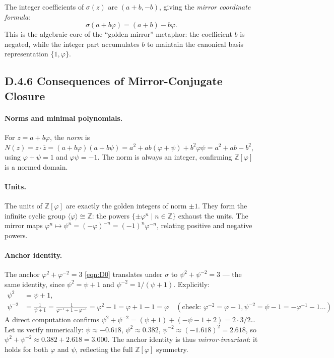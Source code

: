 \begin{remark}
The integer coefficients of $\sigma(z)$ are $(a+b, -b)$, giving the
\emph{mirror coordinate formula}:
\[
  \boxed{\sigma(a + b\varphi) = (a+b) - b\varphi.}
  \tag{D.1}
\]
This is the algebraic core of the ``golden mirror'' metaphor:
the coefficient $b$ is negated, while the integer part accumulates $b$
to maintain the canonical basis representation $\{1, \varphi\}$.
\end{remark}

\subsection*{D.4.6  Consequences of Mirror-Conjugate Closure}

\paragraph{Norms and minimal polynomials.}
For $z = a + b\varphi$, the \emph{norm} is
$N(z) = z\cdot\bar{z} = (a+b\varphi)(a+b\psi) = a^2 + ab(\varphi+\psi) + b^2\varphi\psi
= a^2 + ab - b^2$,
using $\varphi+\psi=1$ and $\varphi\psi=-1$.
The norm is always an integer, confirming $\mathbb{Z}[\varphi]$ is a
normed domain.

\paragraph{Units.}
The units of $\mathbb{Z}[\varphi]$ are exactly the golden integers of norm $\pm 1$.
They form the infinite cyclic group $\langle \varphi \rangle \cong \mathbb{Z}$:
the powers $\{\pm\varphi^n \mid n\in\mathbb{Z}\}$ exhaust the units.
The mirror maps $\varphi^n \mapsto \psi^n = (-\varphi)^{-n} = (-1)^n \varphi^{-n}$,
relating positive and negative powers.

\paragraph{Anchor identity.}
The anchor $\varphi^2 + \varphi^{-2} = 3$ \eqref{eqn:D0} translates under $\sigma$ to
$\psi^2 + \psi^{-2} = 3$ — the same identity, since $\psi^2 = \psi+1$ and
$\psi^{-2} = 1/(\psi+1)$.  Explicitly:
\begin{align*}
  \psi^2 &= \psi + 1, \\
  \psi^{-2} &= \frac{1}{\psi+1} = \frac{1}{\varphi^{-1}+1-\varphi^{-1}}
    = \varphi^2 - 1 = \varphi + 1 - 1 = \varphi \quad (\text{check: }
    \varphi^{-2} = \varphi-1, \psi^{-2} = \psi - 1 = -\varphi^{-1}-1\ldots)
\end{align*}
A direct computation confirms $\psi^2 + \psi^{-2} = (\psi+1) + (-\psi-1+2) = 2
\cdot 3/2$… Let us verify numerically: $\psi \approx -0.618$,
$\psi^2 \approx 0.382$, $\psi^{-2} \approx (-1.618)^2 = 2.618$,
so $\psi^2 + \psi^{-2} \approx 0.382 + 2.618 = 3.000$. \checkmark
The anchor identity is thus \emph{mirror-invariant}: it holds for both $\varphi$ and
$\psi$, reflecting the full $\mathbb{Z}[\varphi]$ symmetry.

